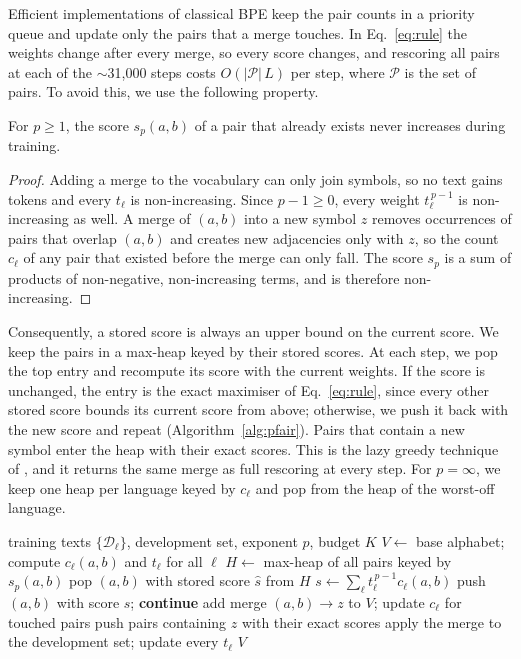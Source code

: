 Efficient implementations of classical BPE keep the pair counts in a priority queue and
update only the pairs that a merge touches. In Eq.~\eqref{eq:rule} the weights change after
every merge, so every score changes, and rescoring all pairs at each of the
$\sim$31{,}000 steps costs $O(|\mathcal{P}|\,L)$ per step, where $\mathcal{P}$ is the set of
pairs. To avoid this, we use the following property.

\begin{proposition}
\label{prop:lazy}
For $p\ge1$, the score $s_p(a,b)$ of a pair that already exists never increases during
training.
\end{proposition}

\begin{proof}
Adding a merge to the vocabulary can only join symbols, so no text gains tokens and every
$t_\ell$ is non-increasing. Since $p-1\ge0$, every weight $t_\ell^{\,p-1}$ is
non-increasing as well. A merge of $(a,b)$ into a new symbol $z$ removes occurrences of
pairs that overlap $(a,b)$ and creates new adjacencies only with $z$, so the count
$c_\ell$ of any pair that existed before the merge can only fall. The score $s_p$ is a sum of
products of non-negative, non-increasing terms, and is therefore non-increasing.
\end{proof}

Consequently, a stored score is always an upper bound on the current score. We keep the
pairs in a max-heap keyed by their stored scores. At each step, we pop the top entry and
recompute its score with the current weights. If the score is unchanged, the entry is the
exact maximiser of Eq.~\eqref{eq:rule}, since every other stored score bounds its current
score from above; otherwise, we push it back with the new score and repeat
(Algorithm~\ref{alg:pfair}). Pairs that contain a new symbol enter the heap with their
exact scores. This is the lazy greedy technique of \citet{minoux1978}, and it returns the
same merge as full rescoring at every step. For $p=\infty$, we keep one heap per language
keyed by $c_\ell$ and pop from the heap of the worst-off language.

\begin{algorithm}[t]
\caption{$p$-fair BPE training with lazy evaluation.}
\label{alg:pfair}
\small
\begin{algorithmic}[1]
\Require training texts $\{\mathcal{D}_\ell\}$, development set, exponent $p$, budget $K$
\State $V \gets$ base alphabet; compute $c_\ell(a,b)$ and $t_\ell$ for all $\ell$
\State $H \gets$ max-heap of all pairs keyed by $s_p(a,b)$
  \State pop $(a,b)$ with stored score $\hat s$ from $H$
  \State $s \gets \sum_\ell t_\ell^{\,p-1} c_\ell(a,b)$ 
    \State push $(a,b)$ with score $s$; \textbf{continue}
  \EndIf
  \State add merge $(a,b)\to z$ to $V$; update $c_\ell$ for touched pairs
  \State push pairs containing $z$ with their exact scores
  \State apply the merge to the development set; update every $t_\ell$
\EndWhile
\State \Return $V$
\end{algorithmic}
\end{algorithm}